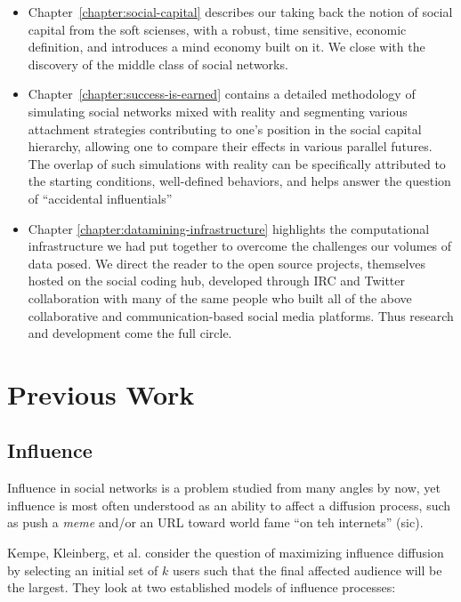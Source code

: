 \documentclass[10pt,oneside]{memoir}
\begin{document}
\begin{Spacing}{2}
\begin{itemize}
\item Chapter~\ref{chapter:social-capital} describes our taking back the notion of social capital from the soft scienses, with a robust, time sensitive, economic definition, and introduces a mind economy built on it.  We close with the discovery of the middle class of social networks.

\item Chapter~\ref{chapter:success-is-earned} contains a detailed methodology of simulating social networks mixed with reality and segmenting various attachment strategies contributing to one's position in the social capital hierarchy, allowing one to compare their effects in various parallel futures.  The overlap of such simulations with reality can be specifically attributed to the starting conditions, well-defined behaviors, and helps answer the question of ``accidental influentials''

\item Chapter \ref{chapter:datamining-infrastructure} highlights the computational infrastructure we had put together to overcome the challenges our volumes of data posed.  We direct the reader to the open source projects, themselves hosted on the social coding hub, developed through IRC and Twitter collaboration with many of the same people who built all of the above collaborative and communication-based social media platforms.  Thus research and development come the full circle.
\end{itemize}

\pagebreak \chapter{Previous Work}
\label{previouswork}

\section{Influence}
\label{influence}

Influence in social networks is a problem studied from many angles by now, yet influence is most often understood as an ability to affect a diffusion process, such as  push a {\itshape meme} and/or an URL toward world fame ``on teh internets'' (sic).


Kempe, Kleinberg, et al. \cite{Kempe:2005:Nodes} consider the question of maximizing influence diffusion by selecting an initial set of $k$ users such that the final affected audience will be the largest.  They look at two established models of influence processes:



\end{Spacing}
\end{document}
